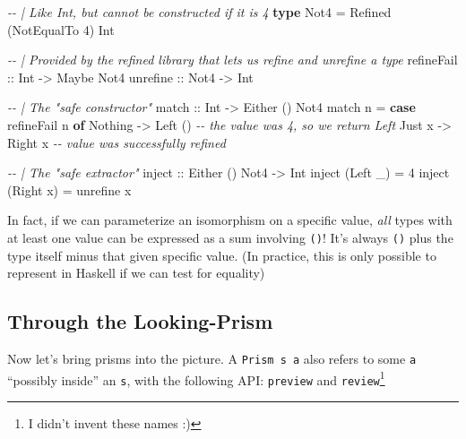 \documentclass[]{article}
\newenvironment{Shaded}{}{}
\newcommand{\CommentTok}[1]{\textcolor[rgb]{0.38,0.63,0.69}{\textit{#1}}}
\newcommand{\DataTypeTok}[1]{\textcolor[rgb]{0.56,0.13,0.00}{#1}}
\newcommand{\DecValTok}[1]{\textcolor[rgb]{0.25,0.63,0.44}{#1}}
\newcommand{\KeywordTok}[1]{\textcolor[rgb]{0.00,0.44,0.13}{\textbf{#1}}}
\newcommand{\NormalTok}[1]{#1}
\newcommand{\OtherTok}[1]{\textcolor[rgb]{0.00,0.44,0.13}{#1}}
\begin{document}
\begin{Shaded}
\begin{Highlighting}[]
\CommentTok{{-}{-} | Like \textasciigrave{}Int\textasciigrave{}, but cannot be constructed if it is 4}
\KeywordTok{type} \DataTypeTok{Not4} \OtherTok{=} \DataTypeTok{Refined}\NormalTok{ (}\DataTypeTok{NotEqualTo} \DecValTok{4}\NormalTok{) }\DataTypeTok{Int}

\CommentTok{{-}{-} | Provided by the \textquotesingle{}refined\textquotesingle{} library that lets us refine and unrefine a type}
\OtherTok{refineFail ::} \DataTypeTok{Int}  \OtherTok{{-}\textgreater{}} \DataTypeTok{Maybe} \DataTypeTok{Not4}
\OtherTok{unrefine   ::} \DataTypeTok{Not4} \OtherTok{{-}\textgreater{}} \DataTypeTok{Int}


\CommentTok{{-}{-} | The "safe constructor"}
\OtherTok{match ::} \DataTypeTok{Int} \OtherTok{{-}\textgreater{}} \DataTypeTok{Either}\NormalTok{ () }\DataTypeTok{Not4}
\NormalTok{match n }\OtherTok{=} \KeywordTok{case}\NormalTok{ refineFail n }\KeywordTok{of}
    \DataTypeTok{Nothing} \OtherTok{{-}\textgreater{}} \DataTypeTok{Left}\NormalTok{ ()          }\CommentTok{{-}{-} the value was 4, so we return \textasciigrave{}Left\textasciigrave{}}
    \DataTypeTok{Just}\NormalTok{ x  }\OtherTok{{-}\textgreater{}} \DataTypeTok{Right}\NormalTok{ x          }\CommentTok{{-}{-} value was successfully refined}

\CommentTok{{-}{-} | The "safe extractor"}
\OtherTok{inject ::} \DataTypeTok{Either}\NormalTok{ () }\DataTypeTok{Not4} \OtherTok{{-}\textgreater{}} \DataTypeTok{Int}
\NormalTok{inject (}\DataTypeTok{Left}\NormalTok{  \_) }\OtherTok{=} \DecValTok{4}
\NormalTok{inject (}\DataTypeTok{Right}\NormalTok{ x) }\OtherTok{=}\NormalTok{ unrefine x}
\end{Highlighting}
\end{Shaded}

In fact, if we can parameterize an isomorphism on a specific value, \emph{all}
types with at least one value can be expressed as a sum involving \texttt{()}!
It's always \texttt{()} plus the type itself minus that given specific value.
(In practice, this is only possible to represent in Haskell if we can test for
equality)

\subsection{Through the Looking-Prism}\label{through-the-looking-prism}

Now let's bring prisms into the picture. A
\texttt{Prism\textquotesingle{}\ s\ a} also refers to some \texttt{a} ``possibly
inside'' an \texttt{s}, with the following API: \texttt{preview} and
\texttt{review}\footnote{I didn't invent these names :)}
\end{document}
